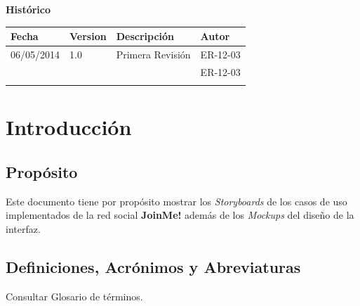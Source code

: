 \documentclass[12pt, a4paper, titlepage]{article}
\begin{document}
\begin{titlepage}
\vspace{2cm}

\begin{center}
	\large{\textbf{Histórico}}
	
    \begin{tabular}{ | p{4cm} | p{2cm} | p{6cm} | p{3cm} |}
    \hline
    \textbf{Fecha} & \textbf{Version} & \textbf{Descripción} & \textbf{Autor} \\ \hline
      06/05/2014 & 1.0 & Primera Revisión & ER-12-03\\ \hline
      &  &  & ER-12-03\\ \hline
     &  & &\\ \hline
    \end{tabular}
\end{center}


\end{titlepage}
\clearpage


\tableofcontents
\clearpage

\section{Introducción}

\subsection{Propósito}
Este documento tiene por propósito mostrar los \textit{Storyboards} de los casos de uso implementados de la red social \textbf{JoinMe!} además de los \textit{Mockups} del diseño de la interfaz.



\subsection{Definiciones, Acrónimos y Abreviaturas}

Consultar Glosario de términos.
\end{document}
